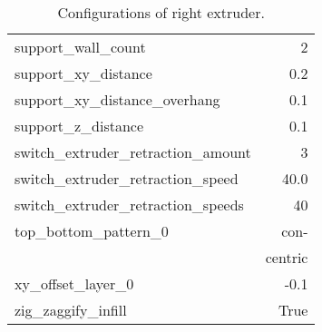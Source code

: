 \begin{multicols}{2}
\begin{table}[H]
\begin{tabular}{|l|r|}
            support\_wall\_count                  & 2              \\
            support\_xy\_distance                 & 0.2            \\
            support\_xy\_distance\_overhang       & 0.1            \\
            support\_z\_distance                  & 0.1            \\
            switch\_extruder\_retraction\_amount  & 3              \\
            switch\_extruder\_retraction\_speed   & 40.0           \\
            switch\_extruder\_retraction\_speeds  & 40             \\
            top\_bottom\_pattern\_0               & con-           \\
                                                  & centric        \\
            xy\_offset\_layer\_0                  & -0.1           \\
            zig\_zaggify\_infill                  & True           \\
            \hline
        \end{tabular}
        \caption{Configurations of right extruder.}
    \end{table}
\end{multicols}